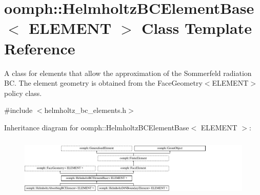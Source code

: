 \hypertarget{classoomph_1_1HelmholtzBCElementBase}{}\section{oomph\+:\+:Helmholtz\+B\+C\+Element\+Base$<$ E\+L\+E\+M\+E\+NT $>$ Class Template Reference}
\label{classoomph_1_1HelmholtzBCElementBase}


A class for elements that allow the approximation of the Sommerfeld radiation BC. The element geometry is obtained from the Face\+Geometry$<$\+E\+L\+E\+M\+E\+N\+T$>$ policy class.  




{\ttfamily \#include $<$helmholtz\+\_\+bc\+\_\+elements.\+h$>$}

Inheritance diagram for oomph\+:\+:Helmholtz\+B\+C\+Element\+Base$<$ E\+L\+E\+M\+E\+NT $>$\+:\begin{figure}[H]
\begin{center}
\leavevmode
\includegraphics[height=2.925810cm]{classoomph_1_1HelmholtzBCElementBase}
\end{center}
\end{figure}
